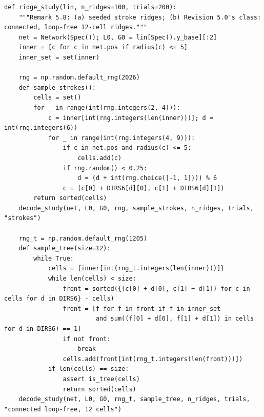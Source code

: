 \documentclass[11pt,a4paper]{article}
\theoremstyle{definition}
\theoremstyle{remark}
\begin{document}
\begin{lstlisting}
def ridge_study(lin, n_ridges=100, trials=200):
    """Remark 5.8: (a) seeded stroke ridges; (b) Revision 5.0's class: connected, loop-free 12-cell ridges."""
    net = Network(Spec()); L0, G0 = lin[Spec().y_base][:2]
    inner = [c for c in net.pos if radius(c) <= 5]
    inner_set = set(inner)

    rng = np.random.default_rng(2026)
    def sample_strokes():
        cells = set()
        for _ in range(int(rng.integers(2, 4))):
            c = inner[int(rng.integers(len(inner)))]; d = int(rng.integers(6))
            for _ in range(int(rng.integers(4, 9))):
                if c in net.pos and radius(c) <= 5:
                    cells.add(c)
                if rng.random() < 0.25:
                    d = (d + int(rng.choice([-1, 1]))) % 6
                c = (c[0] + DIRS6[d][0], c[1] + DIRS6[d][1])
        return sorted(cells)
    decode_study(net, L0, G0, rng, sample_strokes, n_ridges, trials, "strokes")

    rng_t = np.random.default_rng(1205)
    def sample_tree(size=12):
        while True:
            cells = {inner[int(rng_t.integers(len(inner)))]}
            while len(cells) < size:
                front = sorted({(c[0] + d[0], c[1] + d[1]) for c in cells for d in DIRS6} - cells)
                front = [f for f in front if f in inner_set
                         and sum((f[0] + d[0], f[1] + d[1]) in cells for d in DIRS6) == 1]
                if not front:
                    break
                cells.add(front[int(rng_t.integers(len(front)))])
            if len(cells) == size:
                assert is_tree(cells)
                return sorted(cells)
    decode_study(net, L0, G0, rng_t, sample_tree, n_ridges, trials, "connected loop-free, 12 cells")



\end{lstlisting}
\end{document}
